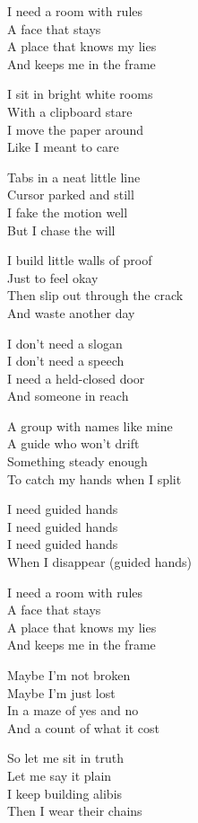 I need a room with rules\\
A face that stays\\
A place that knows my lies\\
And keeps me in the frame

I sit in bright white rooms\\
With a clipboard stare\\
I move the paper around\\
Like I meant to care

Tabs in a neat little line\\
Cursor parked and still\\
I fake the motion well\\
But I chase the will

I build little walls of proof\\
Just to feel okay\\
Then slip out through the crack\\
And waste another day

I don't need a slogan\\
I don't need a speech\\
I need a held-closed door\\
And someone in reach

A group with names like mine\\
A guide who won't drift\\
Something steady enough\\
To catch my hands when I split

I need guided hands\\
I need guided hands\\
I need guided hands\\
When I disappear (guided hands)

I need a room with rules\\
A face that stays\\
A place that knows my lies\\
And keeps me in the frame

Maybe I'm not broken\\
Maybe I'm just lost\\
In a maze of yes and no\\
And a count of what it cost

So let me sit in truth\\
Let me say it plain\\
I keep building alibis\\
Then I wear their chains


